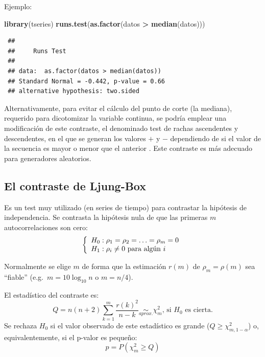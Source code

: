 \documentclass[
  spanish,
  10pt,
]{book}
\newenvironment{Shaded}{\begin{snugshade}}{\end{snugshade}}
\newcommand{\FunctionTok}[1]{\textcolor[rgb]{0.13,0.29,0.53}{\textbf{#1}}}
\newcommand{\NormalTok}[1]{#1}
\newcommand{\SpecialCharTok}[1]{\textcolor[rgb]{0.81,0.36,0.00}{\textbf{#1}}}
\theoremstyle{break}
\theoremstyle{nonumberplain}
\begin{document}
Ejemplo:

\begin{Shaded}
\begin{Highlighting}[]
\FunctionTok{library}\NormalTok{(tseries)}
\FunctionTok{runs.test}\NormalTok{(}\FunctionTok{as.factor}\NormalTok{(datos }\SpecialCharTok{\textgreater{}} \FunctionTok{median}\NormalTok{(datos)))}
\end{Highlighting}
\end{Shaded}

\begin{verbatim}
 ## 
 ##     Runs Test
 ## 
 ## data:  as.factor(datos > median(datos))
 ## Standard Normal = -0.442, p-value = 0.66
 ## alternative hypothesis: two.sided
\end{verbatim}

Alternativamente, para evitar el cálculo del punto de corte (la mediana), requerido para dicotomizar la variable continua, se podría emplear una modificación de este contraste, el denominado test de rachas ascendentes y descendentes, en el que se generan los valores \(+\) y \(-\) dependiendo de si el valor de la secuencia es mayor o menor que el anterior \citep[ver e.g.][]{downham1970}.
Este contraste es más adecuado para generadores aleatorios.

\subsection{El contraste de Ljung-Box}\label{ljungbox}

Es un test muy utilizado (en series de tiempo) para contrastar la hipótesis de independencia.
Se contrasta la hipótesis nula de que las primeras \(m\) autocorrelaciones son cero:
\[\left\{\begin{array}[c]{l}
    H_0:\rho_{1}=\rho_{2}=\ldots=\rho_{m}=0\\
    H_1:\rho_{i}\neq0\text{ para algún } i
\end{array}\right.\]

Normalmente se elige \(m\) de forma que la estimación \(r(m)\) de \(\rho_{m}=\rho(m)\) sea ``fiable'' (e.g.~\(m = 10\log_{10}n\) o \(m = n/4\)).

El estadístico del contraste es:
\[Q=n(n+2)\sum_{k=1}^{m}\frac{r(k)^{2}}{n-k}\underset{aprox.}{\sim}\chi
_{m}^{2}\text{, si }H_0\text{ es cierta.}\]
Se rechaza \(H_0\) si el valor observado de este estadístico es grande (\(Q\geq \chi_{m,1-\alpha}^{2}\)) o, equivalentemente, si el p-valor es pequeño:
\[p=P\left( {\chi_{m}^{2}}\geq Q\right)\]
\end{document}

